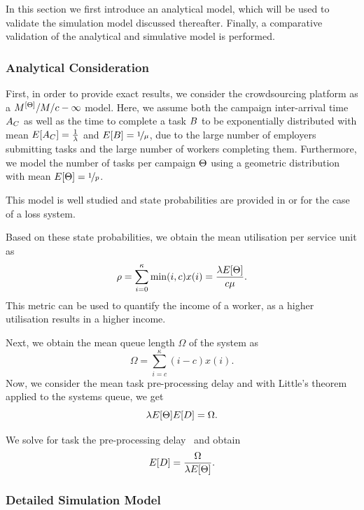 In this section we first introduce an analytical model, which will be used to validate the simulation model discussed thereafter.
Finally, a comparative validation of the analytical and simulative model is performed.

\subsubsection*{Analytical Consideration}

First, in order to provide exact results, we consider the crowdsourcing platform as a \(M^{[\Theta]}/M/c-\infty\) model.
Here, we assume both the campaign inter-arrival time \(A_C\) as well as the time to complete a task \(B\) to be exponentially distributed with mean \(E[A_C] = \frac{1}{\lambda}\) and \(E[B] = \nicefrac{1}{\mu}\), due to the large number of employers submitting tasks and the large number of workers completing them.
Furthermore, we model the number of tasks per campaign \(\Theta\) using a geometric distribution with mean \(E[\Theta] = \nicefrac{1}{p}\).

This model is well studied and state probabilities are provided in \cite{Kleinrock1975} or \cite{TranGia1982} for the case of a loss system.

Based on these state probabilities, we obtain the mean utilisation \workerUtilization per service unit as
\[
\rho = \sum_{i=0}^{\kappa} \min(i, c) x(i) = \frac{\lambda E[\Theta]}{c\mu}. 
\]
This metric can be used to quantify the income of a worker, as a higher utilisation results in a higher income.

Next, we obtain the mean queue length \(\Omega\) of the system as
\[
	\Omega = \sum_{i = c}^\kappa (i - c) x(i).
\]
Now, we consider the mean task pre-processing delay \preTaskProcessingDelay and with Little's theorem applied to the systems queue, we get
\[\lambda E[\Theta] E[D] = \Omega.\]

We solve for task the pre-processing delay \preTaskProcessingDelay~and obtain
\[E[D] = \frac{\Omega}{\lambda E[\Theta]}.\]

\subsubsection*{Detailed Simulation Model}

